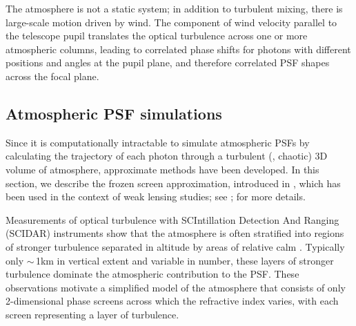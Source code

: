 \documentclass[twocolumn,twocolappendix]{openjournal}
\begin{document}
The atmosphere is not a static system; in addition to turbulent mixing, there is large-scale motion driven by wind.
The component of wind velocity parallel to the telescope pupil  translates the optical turbulence across one or more atmospheric columns, leading to correlated phase shifts for photons with different positions and angles at the pupil plane, and therefore correlated PSF shapes across the focal plane. 


\subsection{Atmospheric PSF simulations} \label{sec:sim}
Since it is computationally intractable to simulate atmospheric PSFs by calculating the trajectory of each photon through a turbulent (\ie, chaotic) 3D volume of atmosphere, approximate methods have been developed. 
In this section, we describe the frozen screen approximation, introduced in , which has been used in the context of weak lensing studies; see \cite{jee_toward_2011, peterson_simulation_2015}; \dcii for more details.

Measurements of optical turbulence with SCIntillation Detection And Ranging (SCIDAR) instruments show that the atmosphere is often stratified into regions of stronger turbulence separated in altitude by areas of relative calm  \citep{osborn_optical_2018, osborn_atmospheric_2018}.
Typically only $\sim\,$1\unit{km} in vertical extent and variable in number, these layers of stronger turbulence dominate the atmospheric contribution to the PSF. 
These observations motivate a simplified model of the atmosphere that consists of only 2-dimensional phase screens across which the refractive index varies, with each screen representing a layer of turbulence.
\end{document}
